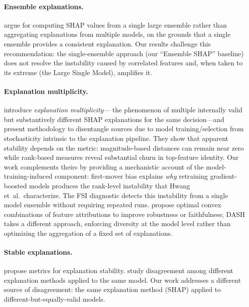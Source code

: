 \documentclass[10pt]{article}
\newcommand{\dash}{\textsc{DASH}}
\begin{document}
\paragraph{Ensemble explanations.}
\citet{paillard2025ensemble} argue for computing SHAP values from a single
large ensemble rather than aggregating explanations from multiple models,
on the grounds that a single ensemble provides a consistent explanation.
Our results challenge this recommendation: the single-ensemble approach
(our ``Ensemble SHAP'' baseline) does not resolve the instability caused
by correlated features and, when taken to its extreme (the Large Single
Model), amplifies it.

\paragraph{Explanation multiplicity.}
\citet{hwang2026explanation} introduce \emph{explanation multiplicity}---
the phenomenon of multiple internally valid but substantively different
SHAP explanations for the same decision---and present methodology to
disentangle sources due to model training/selection from stochasticity
intrinsic to the explanation pipeline. They show that apparent stability
depends on the metric: magnitude-based distances can remain near zero
while rank-based measures reveal substantial churn in top-feature
identity. Our work complements theirs by providing a mechanistic account
of the model-training-induced component: first-mover bias explains
\emph{why} retraining gradient-boosted models produces the rank-level
instability that Hwang et~al.\ characterize. The FSI diagnostic detects
this instability from a single model ensemble without requiring repeated
runs. \citet{decker2024provably} propose optimal convex combinations of
feature attributions to improve robustness or faithfulness; \dash{} takes
a different approach, enforcing diversity at the model level rather than
optimizing the aggregation of a fixed set of explanations.

\paragraph{Stable explanations.}
\citet{alvarez2018towards} propose metrics for explanation stability.
\citet{krishna2022disagreement} study disagreement among different
explanation methods applied to the same model. Our work addresses a
different source of disagreement: the same explanation method (SHAP)
applied to different-but-equally-valid models.
\end{document}
